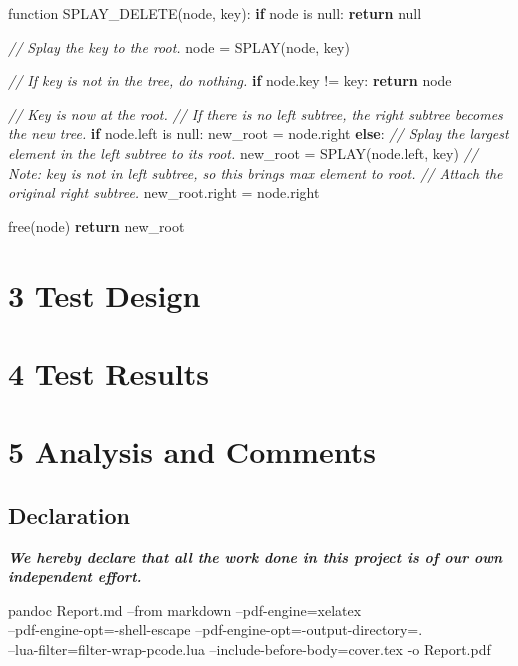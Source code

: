 \documentclass[
]{article}
\newenvironment{Shaded}{}{}
\newcommand{\CommentTok}[1]{\textcolor[rgb]{0.38,0.63,0.69}{\textit{#1}}}
\newcommand{\ControlFlowTok}[1]{\textcolor[rgb]{0.00,0.44,0.13}{\textbf{#1}}}
\newcommand{\NormalTok}[1]{#1}
\begin{document}
\begin{pcode}

\begin{Shaded}
\begin{Highlighting}[]
\NormalTok{function SPLAY\_DELETE(node, key):}
  \ControlFlowTok{if}\NormalTok{ node is null: }\ControlFlowTok{return}\NormalTok{ null}

  \CommentTok{// Splay the key to the root.}
\NormalTok{  node = SPLAY(node, key)}

  \CommentTok{// If key is not in the tree, do nothing.}
  \ControlFlowTok{if}\NormalTok{ node.key != key:}
    \ControlFlowTok{return}\NormalTok{ node}

  \CommentTok{// Key is now at the root.}
  \CommentTok{// If there is no left subtree, the right subtree becomes the new tree.}
  \ControlFlowTok{if}\NormalTok{ node.left is null:}
\NormalTok{    new\_root = node.right}
  \ControlFlowTok{else}\NormalTok{:}
    \CommentTok{// Splay the largest element in the left subtree to its root.}
\NormalTok{    new\_root = SPLAY(node.left, key) }\CommentTok{// Note: key is not in left subtree, so this brings max element to root.}
    \CommentTok{// Attach the original right subtree.}
\NormalTok{    new\_root.right = node.right}
  
\NormalTok{  free(node)}
  \ControlFlowTok{return}\NormalTok{ new\_root}
\end{Highlighting}
\end{Shaded}

\end{pcode}

\hypertarget{test-design}{%
\section{3 Test Design}\label{test-design}}

\hypertarget{test-results}{%
\section{4 Test Results}\label{test-results}}

\hypertarget{analysis-and-comments}{%
\section{5 Analysis and Comments}\label{analysis-and-comments}}

\hypertarget{declaration}{%
\subsection{Declaration}\label{declaration}}

\textbf{\emph{We hereby declare that all the work done in this project
is of our own independent effort.}}

pandoc Report.md --from markdown --pdf-engine=xelatex\\
--pdf-engine-opt=-shell-escape --pdf-engine-opt=-output-directory=.\\
--lua-filter=filter-wrap-pcode.lua --include-before-body=cover.tex -o
Report.pdf
\end{document}
